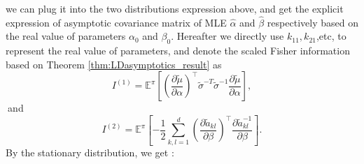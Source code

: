 \documentclass[11pt]{article}%
\theoremstyle{definition}
\begin{document}
we can plug it into the two distributions expression above, and get the
explicit expression of asymptotic covariance matrix of MLE $\widehat{\alpha}$
and $\widehat{\beta}$ respectively based on the real value of parameters
$\alpha_{0}$ and $\beta_{0}$. Hereafter we directly use $k_{11},k_{21}$,etc,
to represent the real value of parameters, and denote the scaled Fisher
information based on Theorem \ref{thm:LDasymptotics_result} as$\ $%
\[
I^{\left(  1\right)  }=\mathbb{E}^{\pi}\left[  \left(  \frac{\partial
\widetilde{\mu}}{\partial\alpha}\right)  ^{\top}\widetilde{\sigma}%
^{-T}\widetilde{\sigma}^{-1}\frac{\partial\widetilde{\mu}}{\partial\alpha
}\right]  ,
\]
$\ $and$\ $%
\[
I^{\left(  2\right)  }=\mathbb{E}^{\pi}\left[  -\frac{1}{2}\sum_{k,l=1}%
^{d}\left(  \frac{\partial\widetilde{a}_{kl}}{\partial\beta}\right)  ^{\top
}\frac{\partial\widetilde{a}_{kl}^{-1}}{\partial\beta}\right]  .
\]
By the stationary distribution, we get :
\end{document}
